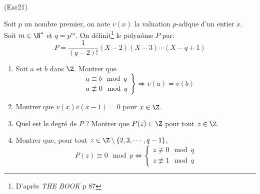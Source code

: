 \begin{tiny}(Ear21)\end{tiny} Soit $p$ un nombre premier, on note $v(x)$ la valuation $p$-adique d'un entier $x$. Soit $m\in\N^*$ et $q=p^m$. 
On définit\footnote{D'après \emph{THE BOOK} p 87} le polynôme $P$ par:
\begin{displaymath}
 P = \frac{1}{(q-2)!}(X-2)(X-3)\cdots (X-q+1)
\end{displaymath}
\begin{enumerate}
 \item Soit $a$ et $b$ dans $\Z$. Montrer que 
\begin{displaymath}
\left. 
\begin{aligned}
&a \equiv b \mod q \\ &a\not \equiv 0 \mod q  
\end{aligned}
\right\rbrace \Rightarrow v(a) = v(b)
\end{displaymath}
 \item Montrer que $v(x)v(x-1)=0$ pour $x\in \Z$.
 \item Quel est le degré de $P$ ? Montrer que $P(z)\in\Z$ pour tout $z\in\Z$.
 \item Montrer que, pour tout $z\in\Z\setminus \{2,3,\cdots,q-1\}$,
\begin{displaymath}
 P(z)\equiv 0 \mod p
\Leftrightarrow
\left\lbrace  
\begin{aligned}
z\not\equiv 0 \mod q \\ z\not\equiv 1 \mod q 
\end{aligned}
 \right. 
\end{displaymath}
\end{enumerate} 